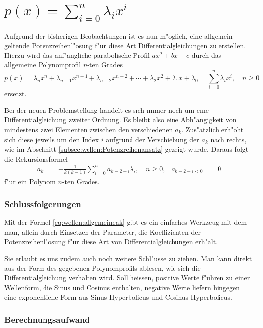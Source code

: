 \section{\texorpdfstring{$p(x) = \sum_{i=0}^{n}\lambda_ix^i$}{p(x) = summe i = 
0 bis n lambdai xi}}

Aufgrund der bisherigen Beobachtungen ist es nun m"oglich, eine 
allgemein geltende Potenzreihenl"osung f"ur diese Art Differentialgleichungen 
zu erstellen. Hierzu wird das anf"angliche parabolische Profil $ax^2 + bx + c$ 
durch das allgemeine Polynomprofil $n$-ten Grades
\begin{equation*}
	p(x) =
	\lambda_nx^n + \lambda_{n-1}x^{n-1} + \lambda_{n-2}x^{n-2} + \dotsb + 
	\lambda_2x^2 + \lambda_1x + \lambda_0 = \sum_{i=0}^{n}\lambda_ix^i, \quad n 
	\ge 0
\end{equation*}
ersetzt.

Bei der neuen Problemstellung handelt es sich immer noch um eine 
Differentialgleichung zweiter Ordnung. Es bleibt also eine Abh"angigkeit von 
mindestens zwei Elementen zwischen den verschiedenen $a_k$. Zus"atzlich erh"oht 
sich diese jeweils um den Index $i$ aufgrund der Verschiebung der $a_k$ nach 
rechts, wie im Abschnitt \ref{subsec:wellen:Potenzreihenansatz} gezeigt wurde. 
Daraus folgt die Rekursionsformel
%
\begin{align}
	a_k &= -\frac{1}{k(k-1)}\sum_{i=0}^{n}a_{k-2-i}\lambda_i, \quad n \ge 0, 
	&a_{k-2-i < 0} &=  0
	\label{eq:wellen:allgemeineak}
\end{align}
f"ur ein Polynom $n$-ten Grades.

\subsubsection{Schlussfolgerungen}

Mit der Formel \eqref{eq:wellen:allgemeineak} gibt es ein einfaches 
Werkzeug mit dem man, allein durch Einsetzen der Parameter, die Koeffizienten 
der Potenzreihenl"osung f"ur diese Art von Differentialgleichungen erh"alt.

Sie erlaubt es uns zudem auch noch weitere Schl"usse zu ziehen. Man kann direkt 
aus der Form des gegebenen Polynomprofils ablesen, wie sich die 
Differentialgleichung verhalten wird. Soll heissen, positive Werte
f"uhren zu einer Wellenform, die Sinus und Cosinus enthalten, negative 
Werte liefern hingegen eine exponentielle Form aus Sinus Hyperbolicus und 
Cosinus Hyperbolicus.

\subsubsection{Berechnungsaufwand}








